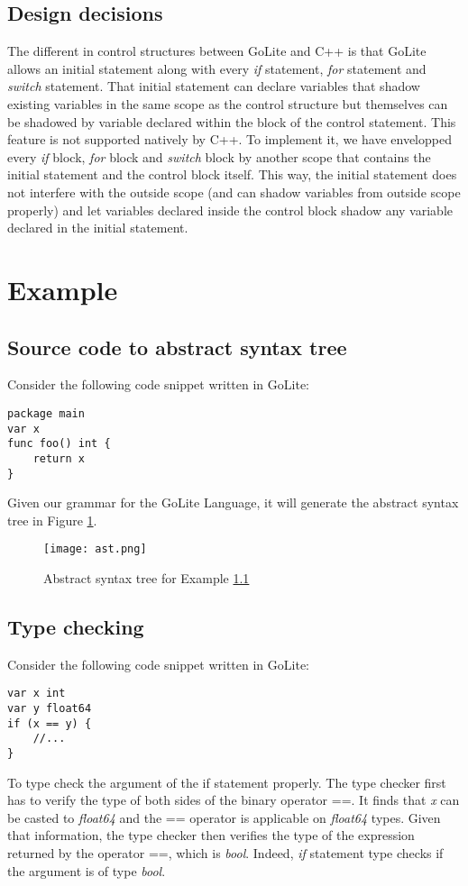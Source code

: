 \documentclass[a4paper]{article}
\begin{document}
\subsection{Design decisions}
The different in control structures between GoLite and C++ is that GoLite allows an initial statement along with every \textit{if} statement, \textit{for} statement and \textit{switch} statement. That initial statement can declare variables that shadow existing variables in the same scope as the control structure but themselves can be shadowed by variable declared within the block of the control statement. This feature is not supported natively by C++. To implement it, we have envelopped every \textit{if} block, \textit{for} block and \textit{switch} block by another scope that contains the initial statement and the control block itself. This way, the initial statement does not interfere with the outside scope (and can shadow variables from outside scope properly) and let variables declared inside the control block shadow any variable declared in the initial statement.

\section{Example}
\subsection{Source code to abstract syntax tree} \label{ex1}
Consider the following code snippet written in GoLite:\\
\begin{verbatim}
package main
var x
func foo() int {
    return x
}
\end{verbatim}
Given our grammar for the GoLite Language, it will generate the abstract syntax tree in Figure \ref{fig:ast}.
\newpage
\begin{figure}
\centering
\texttt{[image: ast.png]}
\caption{\label{fig:ast}Abstract syntax tree for Example \ref{ex1}}
\end{figure}
\subsection{Type checking}
Consider the following code snippet written in GoLite:
\begin{verbatim}
var x int
var y float64
if (x == y) {
    //...
}
\end{verbatim}
To type check the argument of the if statement properly. The type checker first has to verify the type of both sides of the binary operator ==. It finds that \textit{x} can be casted to \textit{float64} and the == operator is applicable on \textit{float64} types. Given that information, the type checker then verifies the type of the expression returned by the operator ==, which is \textit{bool}. Indeed, \textit{if} statement type checks if the argument is of type \textit{bool}.
\end{document}
